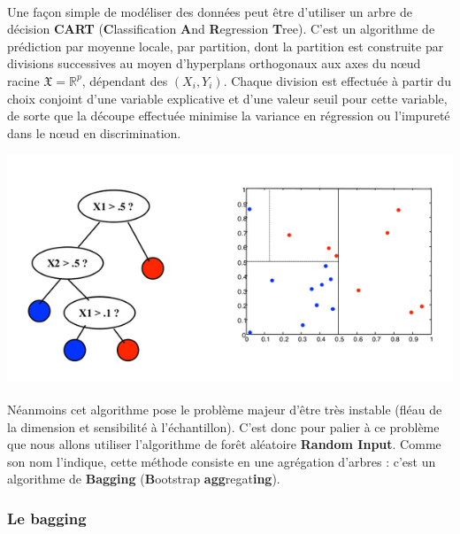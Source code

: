 \documentclass[14pt, openany]{article}
\begin{document}
\paragraph{}
Une façon simple de modéliser des données peut être d'utiliser un arbre de décision \textbf{CART} (\textbf{C}lassification \textbf{A}nd \textbf{R}egression \textbf{T}ree). C'est un algorithme de prédiction par moyenne locale, par partition, dont la partition est construite par divisions successives au moyen d'hyperplans orthogonaux aux axes du nœud racine $\mathfrak{X}=\mathbb{R}^{p}$, dépendant des $(X_i,Y_i)$. Chaque division est effectuée à partir du choix conjoint d'une variable explicative et d'une valeur seuil pour cette variable, de sorte que la découpe effectuée minimise la variance en régression ou l'impureté dans le nœud en discrimination.
\begin{center}
\includegraphics[scale=0.55]{Images/cart.png}
\end{center}
\begin{center}
\label{fig1}
\end{center}
\paragraph{}
Néanmoins cet algorithme pose le problème majeur d'être très instable (fléau de la dimension et sensibilité à l'échantillon). C'est donc pour palier à ce problème que nous allons utiliser l'algorithme de forêt aléatoire \textbf{Random Input}. Comme son nom l'indique, cette méthode consiste en une agrégation d'arbres : c'est un algorithme de \textbf{Bagging} (\textbf{B}ootstrap \textbf{agg}regat\textbf{ing}). 
\subsubsection{Le bagging}
\end{document}
